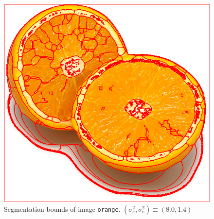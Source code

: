 {\begin{minipage}{\linewidth}
\begin{minipage}{0.45\linewidth}
\begin{figure}[H]
      \includegraphics[scale=0.4]{./images/02/orange/meanshift2_8_1.4.png}
      \caption{Segmentation bounds of image \texttt{orange}.
        $(\sigma_s^2, \sigma_c^2) \equiv (8.0, 1.4)$}
      \label{fig:02_orange2_8_1.4}
    \end{figure}
  \end{minipage}
\end{minipage}
}

